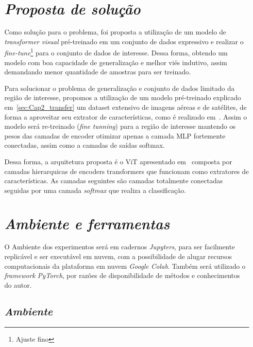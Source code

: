 \section{\textit{Proposta de solução}}\label{sec:Cap3_Proposta}

Como solução para o problema, foi proposta a utilização de um modelo de \textit{transformer visual}  pré-treinado em um conjunto de dados expressivo e realizar o \textit{fine-tune}\footnote{Ajuste fino} para o conjunto de dados de interesse. Dessa forma, obtendo um modelo com boa capacidade de generalização e melhor viés indutivo, assim demandando menor quantidade de amostras para ser treinado.

Para solucionar o problema de generalização e conjunto de dados limitado da região de interesse, propomos a utilização de um modelo pré-treinado explicado em~\ref{sec:Cap2_transfer} um dataset extensivo de imagens aéreas e de satélites, de forma a aproveitar seu extrator de características, como é realizado em~\cite{wang2022empirical}. Assim o modelo será re-treinado (\textit{fine tunning}) para a região de interesse mantendo os pesos das camadas de encoder otimizar apenas a camada MLP fortemente conectadas, assim como a camadas de saídas softmax. 

Dessa forma, a arquitetura proposta é o ViT apresentado em~\cite{wang2022empirical}
composta por camadas hierarquicas de encoders transformers  que funcionam como extratores de características. As camadas seguintes são camadas totalmente conectadas seguidas por uma camada \textit{softmax} que realiza a classificação.

\section{\textit{Ambiente e ferramentas}}\label{sec:Cap3_Ferramentas}


O Ambiente dos experimentos será em cadernos \textit{Jupyters}, para ser facilmente replicável e ser executável em nuvem, com a possibilidade de alugar recursos computacionais da plataforma em nuvem \textit{Google Colab}. Também será utilizado o \textit{framework PyTorch}, por razões de disponibilidade de métodos e conhecimentos do autor. 

\subsection{\textit{Ambiente}}\label{sec:Cap2_Ambiente}


